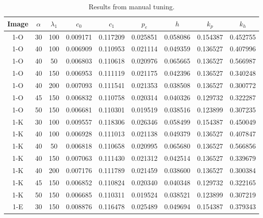 \newpage
\begin{center}
	\begin{longtable}{|c|c|c|c|c|c|c|c|c|}
	\caption{Results from manual tuning.} \label{tab:manualresults}\\
	\hline 
	Image & $\alpha$ & $\lambda_1$ & $c_0$ & $c_1$ & $p_e$ & $h$ & $k_p$ & $k_h$ \\ 	
	\hline \rowcolor{bad} 1-O &	30 &	100 &	0.009171 &	0.117209 &	0.025851 &	0.058086 &	0.154387 &	0.452755 \\
	\hline 1-O &	40 &	100	&	0.006909 &	0.110953 &	0.021114 &	0.049359 &	0.136527 &	0.407996 \\
	\hline 1-O &	40 &	50	&	0.006803 &	0.110618 &	0.020976 &	0.065665 &	0.136527 &	0.566987 \\
	\hline \rowcolor{acceptable} 1-O &	40 & 	150	&	0.006953 &	0.111119 &	0.021175 &	0.042396 &	0.136527 &	0.340248 \\
	\hline \rowcolor{acceptable} 1-O &	40 &	200 &	0.007093 &	0.111541 &	0.021353 &	0.038508 &	0.136527 &	0.300772 \\
	\hline \rowcolor{acceptable} 1-O &	45 &	150 &	0.006832 &	0.110758 &	0.020314 &	0.040326 &	0.129732 &	0.322287 \\
	\hline \rowcolor{acceptable} 1-O &	50 &	150 &	0.006681 &	0.110301 &	0.019519 &	0.038516 &	0.123899 &	0.307235 \\
	\hline \rowcolor{bad} 1-K &	30 &	100 &	0.009557 &	0.118306 &	0.026346 &	0.058499 &	0.154387 &	0.450049 \\
	\hline \rowcolor{acceptable} 1-K &	40 &	100 &	0.006928 &	0.111013 &	0.021138 &	0.049379 &	0.136527 &	0.407847 \\
	\hline 1-K &	40 &	50  &	0.006818 &	0.110658 &	0.020995 &	0.065680 &	0.136527 &	0.566856 \\
	\hline \rowcolor{acceptable} 1-K &	40 &	150 &	0.007063 &	0.111430 &	0.021312 &	0.042514 &	0.136527 &	0.339679 \\
	\hline \rowcolor{acceptable} 1-K &	40 &	200 &	0.007176 &	0.111789 &	0.021459 &	0.038600 &	0.136527 &	0.300384 \\
	\hline \rowcolor{acceptable} 1-K &	45 &	150 &	0.006852 &	0.110824 &	0.020340 &	0.040348 &	0.129732 &	0.322165 \\
	\hline \rowcolor{acceptable} 1-K &	50 &	150 &	0.006685 &	0.110311 &	0.019524 &	0.038521 &	0.123899 &	0.307219 \\
	\hline \rowcolor{bad} 1-E &	30 &	150 &	0.008876 &	0.116478 &	0.025489 &	0.049694 &	0.154387 &	0.379343 \\

\end{longtable}
\end{center}
